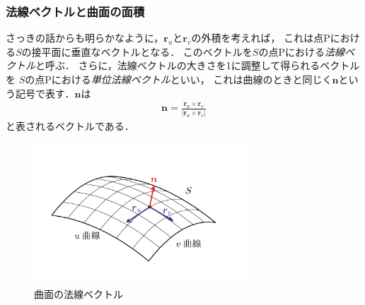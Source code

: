 \subsubsection{法線ベクトルと曲面の面積}
さっきの話からも明らかなように，$\bm{r}_u$と$\bm{r}_v$の外積を考えれば，
これは点Pにおける$S$の接平面に垂直なベクトルとなる．
このベクトルを$S$の点Pにおける\emph{法線ベクトル}と呼ぶ．
さらに，法線ベクトルの大きさを1に調整して得られるベクトルを
$S$の点Pにおける\emph{単位法線ベクトル}といい，
これは曲線のときと同じく$\bm{n}$という記号で表す．$\bm{n}$は
\begin{align}
\bm{n} = \frac{ \bm{r}_u \times \bm{r}_v } { \lvert \bm{r}_u \times \bm{r}_v \rvert }
\label{eq:kyokumenhou}
\end{align}
と表されるベクトルである．

\begin{figure}[h]
 \begin{center}
 \includegraphics[width=8cm]{picture/vecterana4}
 \caption{曲面の法線ベクトル}
\label{fig:kyokuhousen}
 \end{center}
\end{figure}

